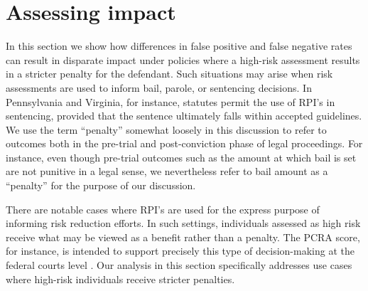 \documentclass[11pt, svgnames]{article}
\numberwithin{equation}{section}
\theoremstyle{plain}
\theoremstyle{definition}
\numberwithin{prop}{section}
\numberwithin{corollary}{section}
\begin{document}

 

\section{Assessing impact} \label{sec:impact}

In this section we show how differences in false positive and false negative rates can result in disparate impact under policies where a high-risk assessment results in a stricter penalty for the defendant.  Such situations may arise when risk assessments are used to inform bail, parole, or sentencing decisions.  In Pennsylvania and Virginia, for instance, statutes permit the use of RPI's in sentencing, provided that the sentence ultimately falls within accepted guidelines\cite{ali-model-code-draft-4}.  We use the term ``penalty'' somewhat loosely in this discussion to refer to outcomes both in the pre-trial and post-conviction phase of legal proceedings. For instance, even though pre-trial outcomes such as the amount at which bail is set are not punitive in a legal sense, we nevertheless refer to bail amount as a ``penalty'' for the purpose of our discussion.  

There are notable cases where RPI's are used for the express purpose of informing risk reduction efforts.  In such settings, individuals assessed as high risk receive what may be viewed as a benefit rather than a penalty.  The PCRA score, for instance, is intended to support precisely this type of decision-making at the federal courts level \citep{skeem2015risk}.  Our analysis in this section specifically addresses use cases where high-risk individuals receive stricter penalties.
\end{document}
